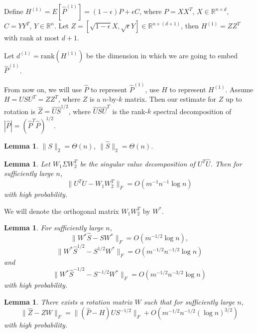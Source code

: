 \documentclass[a4paper]{article}
\newtheorem{lemma}[fact]{Lemma}
\newcommand{\RT}[1]{\marginpar{\footnotesize\color{red}RT: #1}}
\begin{document}
Define $H^{(1)} = E[\hat{P}^{(1)}] = (1-\epsilon) P + \epsilon C$, where $P = X X^T$, $X \in \mathbb{R}^{n \times d}$, $C = Y Y^T$, $Y \in \mathbb{R}^n$.
Let $Z = [\sqrt{1-\epsilon} X, \sqrt{\epsilon} Y] \in \mathbb{R}^{n \times (d+1)}$, then $H^{(1)} = Z Z^T$ with rank at most $d+1$.

Let $d^{(1)} = \mathrm{rank}(H^{(1)})$ be the dimension in which we are going to embed $\hat{P}^{(1)}$.






From now on, we will use $\hat{P}$ to represent $\hat{P}^{(1)}$, use $H$ to represent $H^{(1)}$. Assume $H = U S U^T = Z Z^T$, where $Z$ is a $n$-by-$k$ matrix. Then our estimate for $Z$ up to rotation is $\hat{Z} = \hat{U} \hat{S}^{1/2}$, where $\hat{U} \hat{S} \hat{U}^T$ is the rank-$k$ spectral decomposition of $|\hat{P}| = (\hat{P}^T \hat{P})^{1/2}$.

\begin{lemma}
\label{lemma:eigSShatL1}
$\| S \|_2 = \Theta(n)$, $\| \hat{S} \|_2 = \Theta(n)$.
\end{lemma}
\RT{Need proof here.}


\begin{lemma}
\label{lemma:AlmostOrthogonalL1}
Let $W_1 \Sigma W_2^T$ be the singular value decomposition of $U^T \hat{U}$. Then for sufficiently large $n$, 
\[
	\| U^T \hat{U} - W_1 W_2^T \|_F = O(m^{-1} n^{-1} \log n)
\]
with high probability.
\end{lemma}


We will denote the orthogonal matrix $W_1 W_2^T$ by $W^*$.

\begin{lemma}
\label{lemma:exchangeL1}
For sufficiently large $n$,
\[
	\| W^* \hat{S} - S W^* \|_F = O(m^{-1/2} \log n),
\]
\[
	\|W^* \hat{S}^{1/2} - S^{1/2} W^* \|_F = O(m^{-1/2} n^{-1/2} \log n)
\]
and
\[
	\| W^* \hat{S}^{-1/2} - S^{-1/2} W^* \|_F = O(m^{-1/2} n^{-3/2} \log n)
\]
with high probability.
\end{lemma}




\begin{lemma}
\label{lemma:XhatDiffXWexpressionL1}
There exists a rotation matrix $W$ such that for sufficiently large $n$,
\[
	\|\hat{Z} - Z W\|_F = \| (\hat{P} - H) U S^{-1/2} \|_F + O(m^{-1/2} n^{-1/2} (\log n)^{3/2})
\]
with high probability.
\end{lemma}
\end{document}
